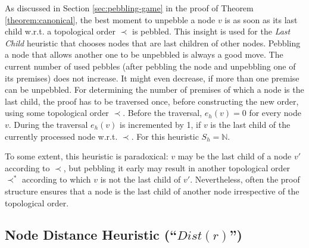As discussed in Section \ref{sec:pebbling-game} in the proof of Theorem \ref{theorem:canonical}, the best moment to unpebble a node $v$ is as soon as its last child w.r.t. a topological order $\prec$ is pebbled. 
This insight is used for the \emph{Last Child} heuristic that chooses nodes that are last children of other nodes. 
Pebbling a node that allows another one to be unpebbled is always a good move. 
The current number of used pebbles (after pebbling the node and unpebbling one of its premises) does not increase.
It might even decrease, if more than one premise can be unpebbled.
For determining the number of premises of which a node is the last child, the proof has to be traversed once, before constructing the new order, using some topological order $\prec$.
Before the traversal, $e_h(v) = 0$ for every node $v$. 
During the traversal $e_h(v)$ is incremented by 1, if $v$ is the last child of the currently processed node w.r.t. $\prec$. 
For this heuristic $S_h = \mathbb{N}$.

To some extent, this heuristic is paradoxical: $v$ may be the last child of a node $v'$ according to $\prec$, but pebbling it early may result in another topological order $\prec^*$ according to which $v$ is not the last child of $v'$.
Nevertheless, often the proof structure ensures that a node is the last child of another node irrespective of the topological order. 




\subsection{Node Distance Heuristic (``$Dist(r)$'')}
\label{sec:distance}

